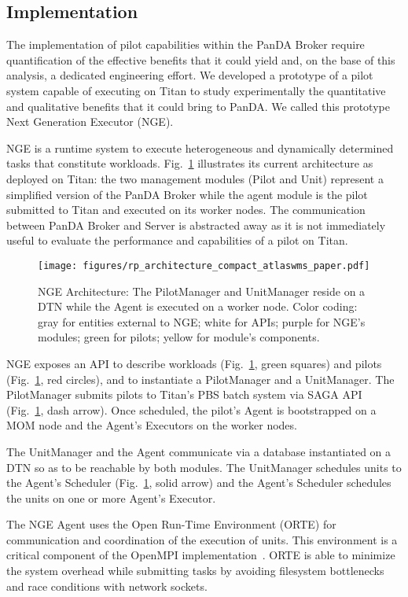 \subsection{Implementation}
\label{sec:arch}

The implementation of pilot capabilities within the PanDA Broker require
quantification of the effective benefits that it could yield and, on the base
of this analysis, a dedicated engineering effort. We developed a prototype of
a pilot system capable of executing on Titan to study experimentally the
quantitative and qualitative benefits that it could bring to PanDA\@. We
called this prototype Next Generation Executor (NGE).

NGE is a runtime system to execute heterogeneous and dynamically determined
tasks that constitute workloads. Fig.~\ref{fig:arch-overview} illustrates its
current architecture as deployed on Titan: the two management modules (Pilot
and Unit) represent a simplified version of the PanDA Broker while the agent
module is the pilot submitted to Titan and executed on its worker nodes. The
communication between PanDA Broker and Server is abstracted away as it is not
immediately useful to evaluate the performance and capabilities of a pilot on
Titan.

\begin{figure}
  \centering
   \texttt{[image: figures/rp\_architecture\_compact\_atlaswms\_paper.pdf]}
   \vspace{-0.3in}
  \caption{NGE Architecture: The PilotManager and UnitManager reside on a DTN
  while the Agent is executed on a worker node. Color coding: gray for
  entities external to NGE\@; white for APIs; purple for NGE's modules; green
  for pilots; yellow for module's components.}
\label{fig:arch-overview}
\end{figure}

NGE exposes an API to describe workloads (Fig.~\ref{fig:arch-overview}, green
squares) and pilots (Fig.~\ref{fig:arch-overview}, red circles), and to
instantiate a PilotManager and a UnitManager. The PilotManager submits pilots
to Titan's PBS batch system via SAGA API (Fig.~\ref{fig:arch-overview}, dash
arrow). %
Once scheduled, the pilot's Agent is bootstrapped on a MOM node and the
Agent's Executors on the worker nodes.

The UnitManager and the Agent communicate via a database instantiated on a
DTN so as to be reachable by both modules. The UnitManager schedules units to
the Agent's Scheduler (Fig.~\ref{fig:arch-overview}, solid arrow) and the
Agent's Scheduler schedules the units on one or more Agent's Executor.

The NGE Agent uses the Open Run-Time Environment (ORTE) for communication and
coordination of the execution of units. This environment is a critical
component of the OpenMPI implementation~\cite{castain05:_open_rte}.
ORTE is able to minimize the system overhead while submitting tasks by
avoiding filesystem bottlenecks and race conditions with network sockets.